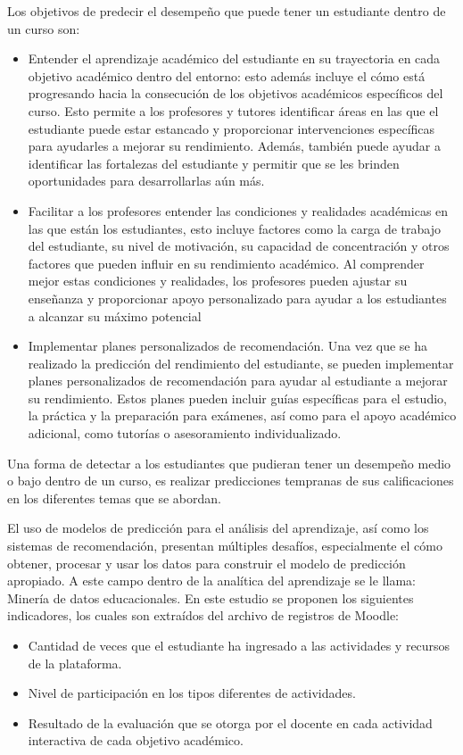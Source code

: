 Los objetivos de predecir el desempeño que puede tener un estudiante dentro de un curso son:
\begin{itemize}

    \item Entender el aprendizaje académico del estudiante en su trayectoria en cada objetivo 
    académico dentro del entorno: esto además incluye el cómo está progresando hacia la consecución de 
    los objetivos académicos específicos del curso. Esto permite a los profesores y tutores identificar 
    áreas en las que el estudiante puede estar estancado y proporcionar intervenciones específicas para 
    ayudarles a mejorar su rendimiento. Además, también puede ayudar a identificar las fortalezas del 
    estudiante y permitir que se les brinden oportunidades para desarrollarlas aún más.

    \item Facilitar a los profesores entender las condiciones y realidades académicas 
    en las que están los estudiantes, esto incluye factores como la carga de trabajo del estudiante, 
    su nivel de motivación, su capacidad de concentración y otros factores que pueden influir en su 
    rendimiento académico. Al comprender mejor estas condiciones y realidades, los profesores 
    pueden ajustar su enseñanza y proporcionar apoyo personalizado para ayudar a los estudiantes 
    a alcanzar su máximo potencial

    \item Implementar planes personalizados de recomendación. Una vez que se ha realizado la predicción 
    del rendimiento del estudiante, se pueden implementar planes personalizados de recomendación para 
    ayudar al estudiante a mejorar su rendimiento. Estos planes pueden incluir guías específicas 
    para el estudio, la práctica y la preparación para exámenes, así como para el apoyo académico adicional, 
    como tutorías o asesoramiento individualizado.

\end{itemize}

Una forma de detectar a los estudiantes que pudieran tener un desempeño medio o bajo dentro de un curso, 
es realizar predicciones tempranas de sus calificaciones en los diferentes temas que se abordan.

El uso de modelos de predicción para el análisis del aprendizaje, así como los sistemas de recomendación, 
presentan múltiples desafíos, especialmente el cómo obtener, procesar y usar los datos para construir el modelo de 
predicción apropiado. A este campo dentro de la analítica del aprendizaje se le llama: Minería de datos educacionales. 
En este estudio se proponen los siguientes indicadores, los cuales son extraídos del archivo de registros de Moodle: 
\begin{itemize}
    \item Cantidad de veces que el estudiante ha ingresado a las actividades y recursos de la plataforma.
    \item Nivel de participación en los tipos diferentes de actividades.
    \item Resultado de la evaluación que se otorga por el docente en cada actividad interactiva de cada objetivo académico.
\end{itemize}

